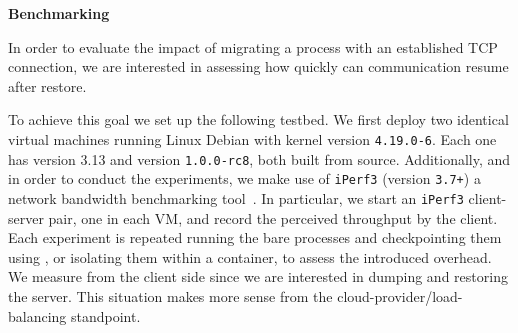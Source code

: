 \textbf{Benchmarking}

In order to evaluate the impact of migrating a process with an established TCP connection, we are interested in assessing how quickly can communication resume after restore.

To achieve this goal we set up the following testbed.
We first deploy two identical virtual machines running Linux Debian with kernel version \texttt{4.19.0-6}.
Each one has \criu version 3.13 and \runc version \texttt{1.0.0-rc8}, both built from source.
Additionally, and in order to conduct the experiments, we make use of \texttt{iPerf3} (version \texttt{3.7+}) a network bandwidth benchmarking tool~\cite{iperf3}.
In particular, we start an \texttt{iPerf3} client-server pair, one in each VM, and record the perceived throughput by the client.
Each experiment is repeated running the bare processes and checkpointing them using \criu, or isolating them within a \runc container, to assess the introduced overhead.
We measure from the client side since we are interested in dumping and restoring the server.
This situation makes more sense from the cloud-provider/load-balancing standpoint.

